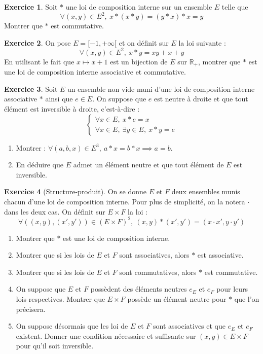 \documentclass[french]{book}
\newcommand{\R}{\mathbb{R}}
\theoremstyle{definition}
\newtheorem{ex}{Exercice}[chapter]
\theoremstyle{theorem}
\theoremstyle{remark}
\begin{document}
\begin{ex}
	Soit $*$ une loi de composition interne sur un ensemble $E$ telle que $$\forall (x,y)\in E^2,\ x*(x*y)=(y*x)*x=y$$ Montrer que $*$ est commutative.
\end{ex}

\begin{ex}
	On pose $E=[-1,+\infty[$ et on définit sur $E$ la loi suivante : $$\forall(x,y)\in E^2,\ x*y=xy+x+y$$ En utilisant le fait que $x\mapsto x+1$ est un bijection de $E$ sur $\R_+$, montrer que $*$ est une loi de composition interne associative et commutative.
\end{ex}

\begin{ex}
	Soit $E$ un ensemble non vide muni d'une loi de composition interne associative $*$ ainsi que $e\in E$. On suppose que $e$ est neutre à droite et que tout élément est inversible à droite, c'est-à-dire : $$\begin{cases}
		\forall x\in E,\ x*e=x \\
		\forall x\in E,\ \exists y\in E,\ x*y=e
	\end{cases}$$
	\begin{enumerate}
		\item Montrer : $\forall (a,b,x)\in E^3,\ a*x=b*x\implies a=b$.
		\item En déduire que $E$ admet un élément neutre et que tout élément de $E$ est inversible. 
	\end{enumerate}
\end{ex}

\begin{ex}[Structure-produit]
	On se donne $E$ et $F$ deux ensembles munis chacun d'une loi de composition interne. Pour plus de simplicité, on la notera $\cdot$ dans les deux cas. On définit sur $E\times F$ la loi : $$\forall \left((x,y),(x',y')\right)\in(E\times F)^2,\ (x,y)*(x',y')=(x\cdot x',y\cdot y')$$
	\begin{enumerate}
		\item Montrer que $*$ est une loi de composition interne.
		\item Montrer que si les lois de $E$ et $F$ sont associatives, alors $*$ est associative.
		\item Montrer que si les lois de $E$ et $F$ sont commutatives, alors $*$ est commutative.
		\item On suppose que $E$ et $F$ possèdent des éléments neutres $e_E$ et $e_F$ pour leurs lois respectives. Montrer que $E\times F$ possède un élément neutre pour $*$ que l'on précisera.
		\item On suppose désormais que les loi de $E$ et $F$ sont associatives et que $e_E$ et $e_F$ existent. Donner une condition nécessaire et suffisante sur $(x,y)\in E\times F$ pour qu'il soit inversible.
	\end{enumerate}
\end{ex}
\end{document}
